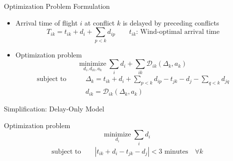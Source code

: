 \documentclass[10pt]{beamer}
\begin{document}
\begin{frame}[t]{Optimization Problem Formulation}
    \begin{itemize}
        \item Arrival time of flight $i$ at conflict $k$ is delayed by preceding conflicts
            \begin{equation*}
                T_{ik} = t_{ik} + d_i +  \sum_{p<k} d_{ip} \qquad t_{ik} \text{: Wind-optimal arrival time}
            \end{equation*}
        \item Optimization problem 
            \begin{equation*}
                \underset{d_i, d_{ik}, a_k}{\text{minimize}} \; \sum_i d_i + \sum_{ik} \mathcal{D}_{ik}(\Delta_{k}, a_k)
            \end{equation*}
            \begin{align*}
                \text{subject to} \qquad
                & \Delta_{k} = t_{ik} + d_i + \sum_{p<k} d_{ip} - t_{jk} - d_j - \sum_{q<k} d_{jq} \\
                & d_{ik} = \mathcal{D}_{ik}(\Delta_{k}, a_k) 
            \end{align*}

    \end{itemize}
\end{frame}
\begin{frame}[t]{Simplification: Delay-Only Model}
    \begin{block}{Optimization problem}
            \begin{equation*}
                \underset{d_i}{\text{minimize}} \; \sum_i d_i 
            \end{equation*}
            \begin{align*}
                \text{subject to} \qquad
                | t_{ik} + d_i - t_{jk} - d_j
 | < 3 \text{ minutes} \quad \forall k\\ 
            \end{align*}
    \end{block}
\end{frame}
\end{document}
